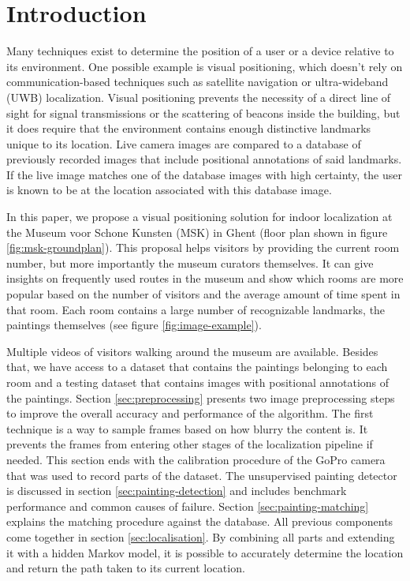 \section{Introduction}

Many techniques exist to determine the position of a user or a device relative to its environment. One possible example is visual positioning, which doesn’t rely on communication-based techniques such as satellite navigation or ultra-wideband (UWB) localization. Visual positioning prevents the necessity of a direct line of sight for signal transmissions or the scattering of beacons inside the building, but it does require that the environment contains enough distinctive landmarks unique to its location. Live camera images are compared to a database of previously recorded images that include positional annotations of said landmarks. If the live image matches one of the database images with high certainty, the user is known to be at the location associated with this database image.

 In this paper, we propose a visual positioning solution for indoor localization at the Museum voor Schone Kunsten (MSK) in Ghent (floor plan shown in figure \ref{fig:msk-groundplan}). This proposal helps visitors by providing the current room number, but more importantly the museum curators themselves. It can give insights on frequently used routes in the museum and show which rooms are more popular based on the number of visitors and the average amount of time spent in that room. Each room contains a large number of recognizable landmarks, the paintings themselves (see figure \ref{fig:image-example}). 

Multiple videos of visitors walking around the museum are available. Besides that, we have access to a dataset that contains the paintings belonging to each room and a testing dataset that contains images with positional annotations of the paintings. Section \ref{sec:preprocessing} presents two image preprocessing steps to improve the overall accuracy and performance of the algorithm. The first technique is a way to sample frames based on how blurry the content is. It prevents the frames from entering other stages of the localization pipeline if needed. This section ends with the calibration procedure of the GoPro camera that was used to record parts of the dataset. The unsupervised painting detector is discussed in section \ref{sec:painting-detection} and includes benchmark performance and common causes of failure. Section \ref{sec:painting-matching} explains the matching procedure against the database. All previous components come together in section \ref{sec:localisation}. By combining all parts and extending it with a hidden Markov model, it is possible to accurately determine the location and return the path taken to its current location.

